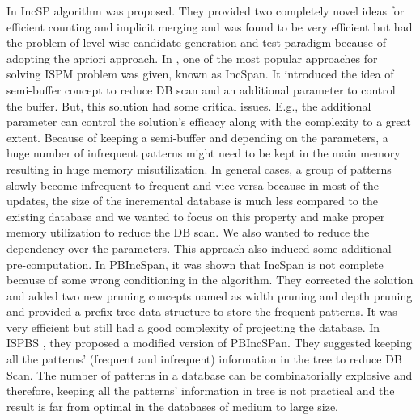 In \cite{lin2004incremental} IncSP algorithm was proposed. They provided two completely novel ideas for efficient counting and implicit merging and was found to be very efficient but had the problem of level-wise candidate generation and test paradigm because of adopting the apriori approach. In \cite{cheng2004incspan}, one of the most popular approaches for solving ISPM problem was given, known as IncSpan. It introduced the idea of semi-buffer concept to reduce DB scan and an additional parameter to control the buffer. But, this solution had some critical issues. E.g., the additional parameter can control the solution's efficacy along with the complexity to a great extent. Because of keeping a semi-buffer and depending on the parameters, a huge number of infrequent patterns might need to be kept in the main memory resulting in huge memory misutilization. In general cases, a group of patterns slowly become infrequent to frequent and vice versa because in most of the updates, the size of the incremental database is much less compared to the existing database and we wanted to focus on this property and make proper memory utilization to reduce the DB scan. We also wanted to reduce the dependency over the parameters. This approach also induced some additional pre-computation. In PBIncSpan\cite{chen2007incremental}, it was shown that IncSpan is not complete because of some wrong conditioning in the algorithm. They corrected the solution and added two new pruning concepts named as width pruning and depth pruning and provided a prefix tree data structure to store the frequent patterns. It was very efficient but still had a good complexity of projecting the database. In ISPBS \cite{liu2012incremental}, they proposed a modified version of PBIncSPan. They suggested keeping all the patterns' (frequent and infrequent) information in the tree to reduce DB Scan. The number of patterns in a database can be combinatorially explosive and therefore, keeping all the patterns' information in tree is not practical and the result is far from optimal in the databases of medium to large size. 


